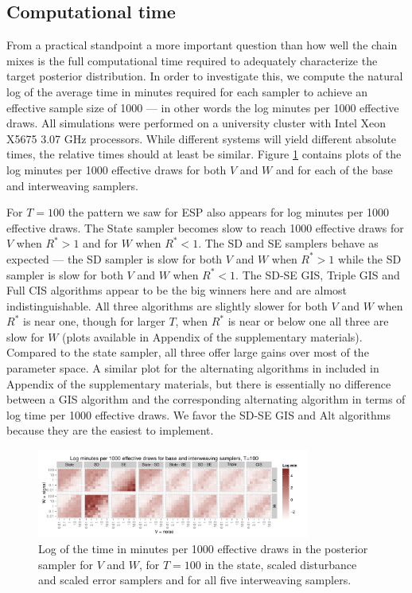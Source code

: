 \documentclass[12pt]{article}
\begin{document}
\subsection{Computational time}\label{sec:LLM:time}

From a practical standpoint a more important question than how well the chain mixes is the full computational time required to adequately characterize the target posterior distribution. In order to investigate this, we compute the natural log of the average time in minutes required for each sampler to achieve an effective sample size of 1000 --- in other words the log minutes per 1000 effective draws. All simulations were performed on a university cluster with Intel Xeon X5675 3.07 GHz processors. While different systems will yield different absolute times, the relative times should at least be similar. Figure \ref{baseinttimeplot} contains plots of the log minutes per 1000 effective draws for both $V$ and $W$ and for each of the base and interweaving samplers.

For $T=100$ the pattern we saw for ESP also appears for log minutes per 1000 effective draws. The State sampler becomes slow to reach 1000 effective draws for $V$ when $R^*>1$ and for $W$ when $R^*<1$. The SD and SE samplers behave as expected --- the SD sampler is slow for both $V$ and $W$ when $R^*>1$ while the SD sampler is slow for both $V$ and $W$ when $R^*<1$. The SD-SE GIS, Triple GIS and Full CIS algorithms appear to be the big winners here and are almost indistinguishable. All three algorithms are slightly slower for both $V$ and $W$ when $R^*$ is near one, though for larger $T$,  when $R^*$ is near or below one all three are slow for $W$ (plots available in Appendix  of the supplementary materials). Compared to the state sampler, all three offer large gains over most of the parameter space. A similar plot for the alternating algorithms in included in Appendix  of the supplementary materials, but there is essentially no difference between a GIS algorithm and the corresponding alternating algorithm in terms of log time per 1000 effective draws. We favor the SD-SE GIS and Alt algorithms because they are the easiest to implement.

\begin{figure}[!h]
\centering
\includegraphics[width=0.8\textwidth]{baseinttimeplot100}
\caption{Log of the time in minutes per 1000 effective draws in the posterior sampler for $V$ and $W$, for $T=100$ in the state, scaled disturbance and scaled error samplers and for all five interweaving samplers.}
\label{baseinttimeplot}
\end{figure}
\end{document}
